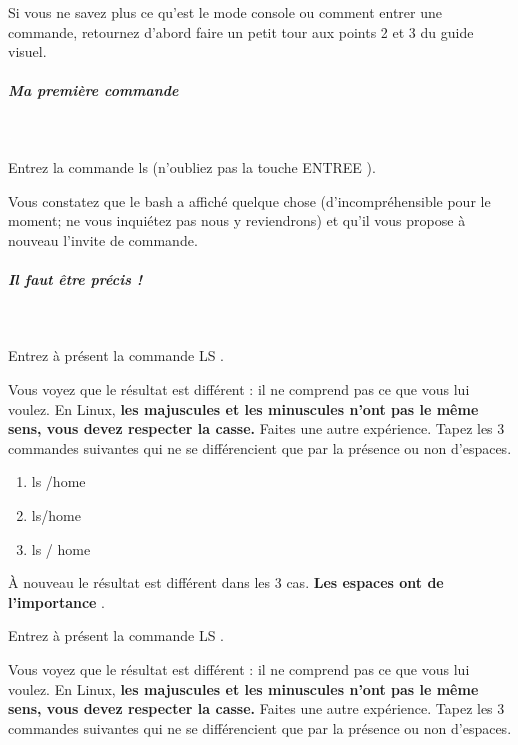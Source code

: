 \documentclass[11pt,a4paper]{article}
\begin{document}
Si vous ne savez plus ce qu'est le mode console ou comment entrer une commande, retournez d'abord faire un petit tour aux points 2 et 3 du guide visuel.

  
			
		\subparagraph{Ma premi\`ere commande} 
		
					\textcolor{white}{.} \par
				
            \par
        
Entrez la commande ls  (n'oubliez pas la touche ENTREE ).

Vous constatez que le bash a affich\'e quelque chose (d'incompr\'ehensible
pour le moment; ne vous inqui\'etez pas nous y reviendrons) et qu'il vous propose \`a nouveau l'invite de commande. 

			
		\subparagraph{Il faut \^etre pr\'ecis !} 
		
					\textcolor{white}{.} \par
				
            \par
        
Entrez \`a pr\'esent  la commande LS .

Vous voyez que le r\'esultat est diff\'erent : il ne comprend pas ce que vous lui voulez. En Linux,  \textbf{les majuscules et les minuscules n'ont pas le m\^eme sens, vous devez respecter la casse.} 
Faites une autre exp\'erience. Tapez les 3 commandes suivantes qui ne se diff\'erencient que par la pr\'esence ou non d'espaces. 

					\begin{enumerate}
				
			\item ls /home 
			\item ls/home 
			\item ls / home 
					\end{enumerate}
				
\`A nouveau le r\'esultat est diff\'erent dans les 3 cas.  \textbf{Les espaces ont de l'importance} .






Entrez \`a pr\'esent  la commande LS .

Vous voyez que le r\'esultat est diff\'erent : il ne comprend pas ce que vous lui voulez. En Linux,  \textbf{les majuscules et les minuscules n'ont pas le m\^eme sens, vous devez respecter la casse.} 
Faites une autre exp\'erience. Tapez les 3 commandes suivantes qui ne se diff\'erencient que par la pr\'esence ou non d'espaces. 
\end{document}
